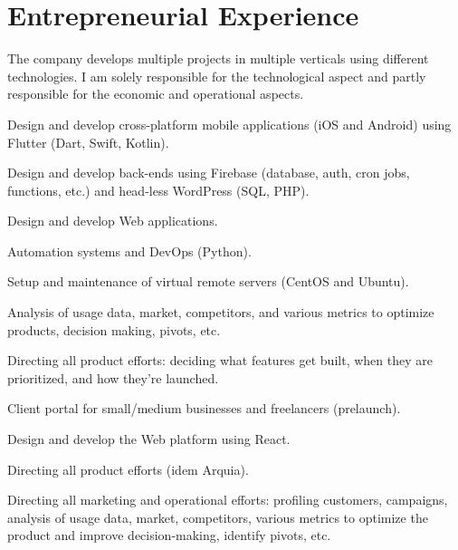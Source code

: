 \documentclass[]{deedy-resume-openfont}
\begin{document}
\hfill
\begin{minipage}[t]{0.50\textwidth} 


\section{Entrepreneurial Experience}

The company develops multiple projects in multiple verticals using different technologies. I am solely responsible for the technological aspect and partly responsible for the economic and operational aspects.
\vspace{\topsep} %
\begin{tightemize}
\item Design and develop cross-platform mobile applications (iOS and Android) using Flutter (Dart, Swift, Kotlin).
\item Design and develop back-ends using Firebase (database, auth, cron jobs, functions, etc.) and head-less WordPress (SQL, PHP). 
\item Design and develop Web applications.
\item Automation systems and DevOps (Python).
\item Setup and maintenance of virtual remote servers (CentOS and Ubuntu).
\item Analysis of usage data, market, competitors, and various metrics to optimize products, decision making, pivots, etc.
\item Directing all product efforts: deciding what features get built, when they are prioritized, and how they're launched.
\end{tightemize}
\sectionsep


Client portal for small/medium businesses and freelancers (prelaunch).
\begin{tightemize}
\item Design and develop the Web platform using React.
\item Directing all product efforts (idem Arquia).
\item Directing all marketing and operational efforts: profiling customers, campaigns, analysis of usage data, market, competitors, various metrics to optimize the product and improve decision-making, identify pivots, etc.
\end{tightemize}
\sectionsep



\end{minipage}
\end{document}
